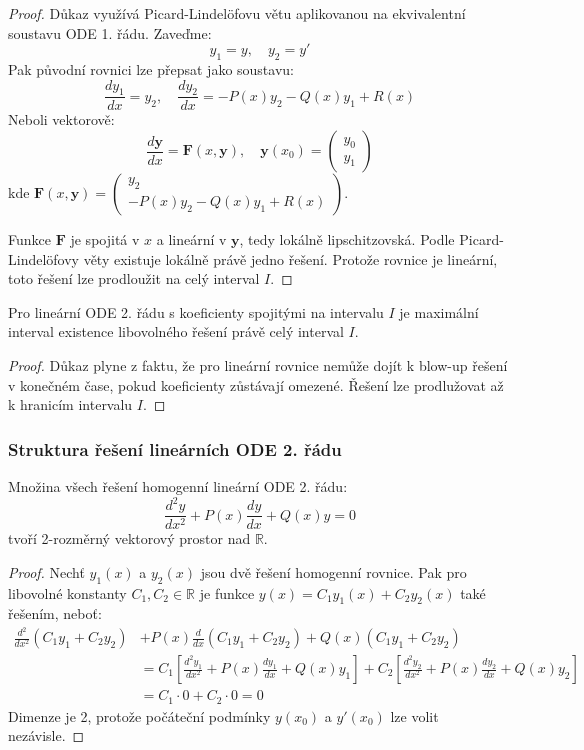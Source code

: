 \begin{proof}
Důkaz využívá Picard-Lindelöfovu větu aplikovanou na ekvivalentní soustavu ODE 1. řádu. Zaveďme:
\[
y_1 = y, \quad y_2 = y'
\]
Pak původní rovnici lze přepsat jako soustavu:
\[
\frac{dy_1}{dx} = y_2, \quad \frac{dy_2}{dx} = -P(x)y_2 - Q(x)y_1 + R(x)
\]
Neboli vektorově:
\[
\frac{d\mathbf{y}}{dx} = \mathbf{F}(x, \mathbf{y}), \quad \mathbf{y}(x_0) = \begin{pmatrix} y_0 \\ y_1 \end{pmatrix}
\]
kde $\mathbf{F}(x, \mathbf{y}) = \begin{pmatrix} y_2 \\ -P(x)y_2 - Q(x)y_1 + R(x) \end{pmatrix}$.

Funkce $\mathbf{F}$ je spojitá v $x$ a lineární v $\mathbf{y}$, tedy lokálně lipschitzovská. Podle Picard-Lindelöfovy věty existuje lokálně právě jedno řešení. Protože rovnice je lineární, toto řešení lze prodloužit na celý interval $I$.
\end{proof}

\begin{theorem}
Pro lineární ODE 2. řádu s koeficienty spojitými na intervalu $I$ je maximální interval existence libovolného řešení právě celý interval $I$.
\end{theorem}

\begin{proof}
Důkaz plyne z faktu, že pro lineární rovnice nemůže dojít k blow-up řešení v konečném čase, pokud koeficienty zůstávají omezené. Řešení lze prodlužovat až k hranicím intervalu $I$.
\end{proof}

\subsubsection{Struktura řešení lineárních ODE 2. řádu}
\label{subsubsec:struktura-reseni}

\begin{theorem}
Množina všech řešení homogenní lineární ODE 2. řádu:
\[
\frac{d^2y}{dx^2} + P(x)\frac{dy}{dx} + Q(x)y = 0
\]
tvoří 2-rozměrný vektorový prostor nad $\mathbb{R}$.
\end{theorem}

\begin{proof}
Nechť $y_1(x)$ a $y_2(x)$ jsou dvě řešení homogenní rovnice. Pak pro libovolné konstanty $C_1, C_2 \in \mathbb{R}$ je funkce $y(x) = C_1y_1(x) + C_2y_2(x)$ také řešením, neboť:
\begin{align*}
\frac{d^2}{dx^2}(C_1y_1 + C_2y_2) &+ P(x)\frac{d}{dx}(C_1y_1 + C_2y_2) + Q(x)(C_1y_1 + C_2y_2) \\
&= C_1\left[\frac{d^2y_1}{dx^2} + P(x)\frac{dy_1}{dx} + Q(x)y_1\right] + C_2\left[\frac{d^2y_2}{dx^2} + P(x)\frac{dy_2}{dx} + Q(x)y_2\right] \\
&= C_1 \cdot 0 + C_2 \cdot 0 = 0
\end{align*}
Dimenze je 2, protože počáteční podmínky $y(x_0)$ a $y'(x_0)$ lze volit nezávisle.
\end{proof}

